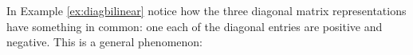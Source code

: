 \begin{aside}{}{}
\end{aside}

\goodbreak


In Example \ref{ex:diagbilinear} notice how the three diagonal matrix representations have something in common: one each of the diagonal entries are positive and negative. This is a general phenomenon:

